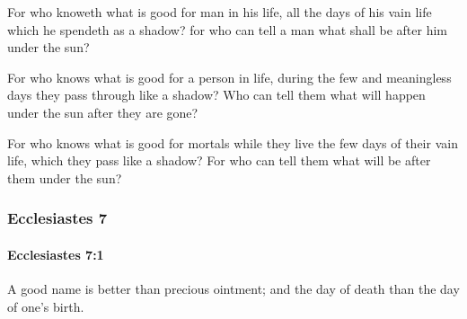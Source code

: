 			\begin{versebox}
					\item[BHS] 
					\item[ASV] For who knoweth what is good for man in his life, all the days of his vain life which he spendeth as a shadow? for who can tell a man what shall be after him under the sun?
					\item[NIV] For who knows what is good for a person in life, during the few and meaningless days they pass through like a shadow? Who can tell them what will happen under the sun after they are gone?
					\item[NRSV] For who knows what is good for mortals while they live the few days of their vain life, which they pass like a shadow? For who can tell them what will be after them under the sun?
			\end{versebox}
	\subsubsection{Ecclesiastes 7} %
		\label{ECCLESIASTES-7}

		\paragraph{Ecclesiastes 7:1} %
			\label{ECCLESIASTES-7-1}

			A good name is better than precious ointment; and the day of death than the day of one’s birth.

